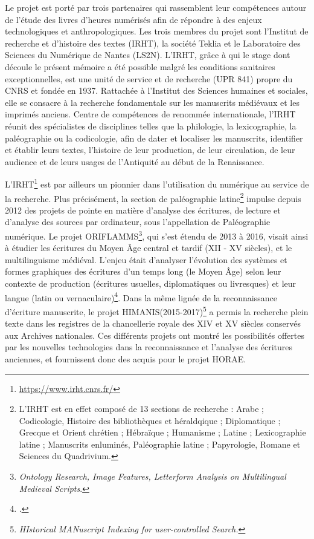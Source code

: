 \documentclass[a4paper,12pt,twoside]{book}
\begin{document}
	Le projet est porté par trois partenaires qui rassemblent leur compétences autour de l'étude des livres d'heures numérisés afin de répondre à des enjeux technologiques et anthropologiques. Les trois membres du projet sont l'Institut de recherche et d’histoire des textes (IRHT), la société Teklia et le Laboratoire des Sciences du Numérique de Nantes (LS2N). L'IRHT, grâce à qui le stage dont découle le présent mémoire a été possible malgré les conditions sanitaires exceptionnelles, est une unité de service et de recherche (UPR 841) propre du CNRS et fondée en 1937. Rattachée à l’Institut des Sciences humaines et sociales, elle se consacre à la recherche fondamentale sur les manuscrits médiévaux et les imprimés anciens. Centre de compétences de renommée internationale, l'IRHT réunit des spécialistes de disciplines telles que la philologie, la lexicographie, la paléographie ou la codicologie, afin de dater et localiser les manuscrits, identifier et établir leurs textes, l'histoire de leur production, de leur circulation, de leur audience et de leurs usages de l'Antiquité au début de la Renaissance. 

L'IRHT\footnote{\url{https://www.irht.cnrs.fr/}} est par ailleurs un pionnier dans l'utilisation du numérique au service de la recherche. Plus précisément, la section de paléographie latine\footnote{L'IRHT est en effet composé de 13 sections de recherche : Arabe ; Codicologie, Histoire des bibliothèques et héraldqique ; Diplomatique ; Grecque et Orient chrétien ; Hébraïque ; Humanisme ; Latine ; Lexicographie latine ; Manuscrits enluminés, Paléographie latine ; Papyrologie, Romane et Sciences du Quadrivium.} impulse depuis 2012 des projets de pointe en matière d’analyse des écritures, de lecture et d’analyse des sources par ordinateur, sous l'appellation de \og Paléographie numérique\fg{}. Le projet ORIFLAMMS\footnote{\textit{Ontology Research, Image Features, Letterform Analysis on Multilingual Medieval Scripts}.}, qui s'est étendu de 2013 à 2016, visait ainsi à étudier les écritures du Moyen Âge central et tardif (\textsc{XII} - \textsc{XV} siècles), et le multilinguisme médiéval. L'enjeu était d'analyser l’évolution des systèmes et formes graphiques des écritures d’un temps long (le Moyen Âge) selon leur contexte de production (écritures usuelles, diplomatiques ou livresques) et leur langue (latin ou vernaculaire)\footcite[p. 81]{oriflamms}. Dans la même lignée de la reconnaissance d'écriture manuscrite, le projet HIMANIS(2015-2017)\footnote{\textit{HIstorical MANuscript Indexing for user-controlled Search.}} a permis la recherche plein texte dans les registres de la chancellerie royale des \textsc{XIV} et \textsc{XV} siècles conservés aux Archives nationales. Ces différents projets ont montré les possibilités offertes par les nouvelles technologies dans la reconnaissance et l'analyse des écritures anciennes, et fournissent donc des acquis pour le projet HORAE. 
\end{document}
